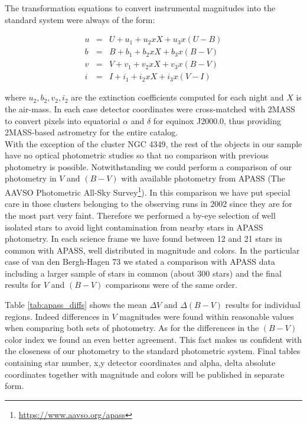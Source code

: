 \documentclass[draft]{aa}
\begin{document}
The transformation equations to convert instrumental magnitudes into the
standard system were always of the form:

\begin{eqnarray*}
    u & = & U+u_1+u_2xX+u_3x(U-B) \\
    b & = & B+b_1+b_2xX+b_3x(B-V) \\
    v & = & V+v_1+v_2xX+v_3x(B-V) \\
    i & = & I+i_1+i_2xX+i_3x(V-I)
\end{eqnarray*}

where $u_2, b_2, v_2, i_2$ are the extinction coefficients computed for each
night and $X$ is the air-mass. In each case detector coordinates were
cross-matched with 2MASS \citep{2006AJ....131.1163S} to convert pixels into
equatorial $\alpha$ and $\delta$ for equinox J2000.0, thus providing 2MASS-based
astrometry for the entire catalog.\\

With the exception of the cluster NGC 4349, the rest of the objects in our
sample have no optical photometric studies so that no comparison with previous
photometry is possible. Notwithstanding we could perform a comparison of our
photometry in $V$ and $(B-V)$ with available photometry from APASS (The AAVSO
Photometric All-Sky Survey\footnote{\url{https://www.aavso.org/apass}}).
In this comparison we have put special care in those clusters belonging to the
observing runs in 2002 since they are for the most part very faint. Therefore
we performed a by-eye selection of well isolated stars to avoid light
contamination from nearby stars in APASS photometry. In each science frame we
have found between 12 and 21 stars in common with APASS, well distributed in
magnitude and colors.
In the particular case of van den Bergh-Hagen 73 we stated a comparison with
APASS data including a larger sample of stars in common (about 300 stars) and
the final results for $V$ and $(B-V)$ comparisons were of the same order.

Table \ref{tab:apass_diffs} shows the mean $\Delta V$ and $\Delta(B-V)$ results
for individual regions. Indeed differences in $V$ magnitudes were found within
reasonable values when comparing both sets of photometry. As for the differences
in the $(B-V)$ color index we found an even better agreement. This fact makes us
confident with the closeness of our photometry to the standard photometric
system. Final tables containing star number, x,y detector coordinates and alpha,
delta absolute coordinates together with magnitude and colors will be published
in separate form.
\end{document}
